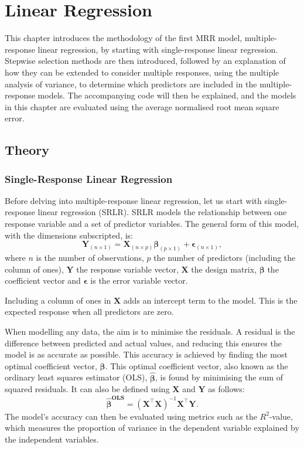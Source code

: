 \documentclass[11pt]{report} %
\begin{document}
\chapter{Linear Regression}
\label{C3}
This chapter introduces the methodology of the first MRR model, multiple-response linear regression, by starting with single-response linear regression. Stepwise selection methods are then introduced, followed by an explanation of how they can be extended to consider multiple responses, using the multiple analysis of variance, to determine which predictors are included in the multiple-response models. The accompanying code will then be explained, and the models in this chapter are evaluated using the average normalised root mean square error.

\section{Theory}

\subsection{Single-Response Linear Regression}
Before delving into multiple-response linear regression, let us start with single-response linear regression (SRLR). SRLR models the relationship between one response variable and a set of predictor variables. The general form of this model, with the dimensions subscripted, is:
\begin{equation}
\mathbf{Y}_{(n \times 1)} = \mathbf{X}_{(n \times p)} \boldsymbol{\beta}_{(p \times 1)} + \boldsymbol{\epsilon}_{(n \times 1)},
\label{SRLR}
\end{equation}
\noindent where $n$ is the number of observations, $p$ the number of predictors (including the column of ones), $\mathbf{Y}$ the response variable vector, $\mathbf{X}$ the design matrix, $\boldsymbol{\beta}$ the coefficient vector and $\boldsymbol{\epsilon}$ is the error variable vector. 

Including a column of ones in $\mathbf{X}$ adds an intercept term to the model. This is the expected response when all predictors are zero.

When modelling any data, the aim is to minimise the residuals. A residual is the difference between predicted and actual values, and reducing this ensures the model is as accurate as possible. This accuracy is achieved by finding the most optimal coefficient vector, $\boldsymbol{\beta}$. This optimal coefficient vector, also known as the ordinary least squares estimator (OLS), \( \boldsymbol{\hat{\beta}} \), is found by minimising the sum of squared residuals. It can also be defined using $\mathbf{X}$ and $\mathbf{Y}$ as follows:
\[
\boldsymbol{\hat{\beta}^{\text{OLS}}} = (\mathbf{X}^\top \mathbf{X})^{-1}\mathbf{X}^\top \mathbf{Y}.
\]
The model's accuracy can then be evaluated using metrics such as the $R^2$-value, which measures the proportion of variance in the dependent variable explained by the independent variables. 
\end{document}
